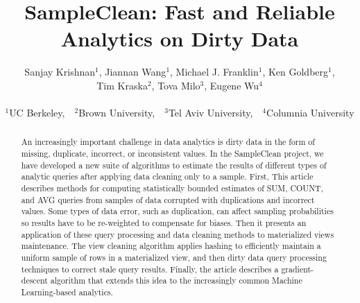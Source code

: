 \documentclass[11pt]{article}
\begin{document}
\newcommand{\jn}[1]{\textcolor{red}{\{\{JN: #1\}\}}\xspace}

\def\ojoin{\setbox0=\hbox{$\bowtie$}%
  \rule[-.02ex]{.25em}{.4pt}\llap{\rule[\ht0]{.25em}{.4pt}}}
\def\leftouterjoin{\mathbin{\ojoin\mkern-5.8mu\bowtie}}
\def\rightouterjoin{\mathbin{\bowtie\mkern-5.8mu\ojoin}}
\def\fullouterjoin{\mathbin{\ojoin\mkern-5.8mu\bowtie\mkern-5.8mu\ojoin}}

\setlength{\belowdisplayskip}{1pt} \setlength{\belowdisplayshortskip}{1pt}
\setlength{\abovedisplayskip}{1pt} \setlength{\abovedisplayshortskip}{1pt}

\author{ Sanjay Krishnan$^1$, Jiannan Wang$^1$, Michael J. Franklin$^1$, Ken Goldberg$^1$,\\
Tim Kraska$^2$, Tova Milo$^3$, Eugene Wu$^4$\\ \\
$^1$UC Berkeley,~~$^2$Brown University,~~$^3$Tel Aviv University,~~$^4$Columnia University \\
}

\title{SampleClean: Fast and Reliable Analytics on Dirty Data}
\maketitle
\begin{abstract}
An increasingly important challenge in data analytics is dirty data in the form of missing, duplicate, incorrect, or inconsistent values.  
In the SampleClean project, we have developed a new suite of algorithms to estimate the results of different types of analytic queries after applying data cleaning only to a sample.
First, This article describes methods for computing statistically bounded estimates of SUM, COUNT, and AVG queries from samples of data corrupted with duplications and incorrect values.
Some types of data error, such as duplication, can affect sampling probabilities so results have to be re-weighted to compensate for biases.
Then it presents an application of these query processing and data cleaning methods to materialized views maintenance.
The view cleaning algorithm applies hashing to efficiently maintain a uniform sample of rows in a materialized view, and then dirty data query processing techniques to correct stale query results.
Finally, the article describes a gradient-descent algorithm that extends this idea to the increasingly common Machine Learning-based analytics.
\end{abstract}











\fontsize{8.2pt}{8.4pt} \selectfont

 
\end{document}
